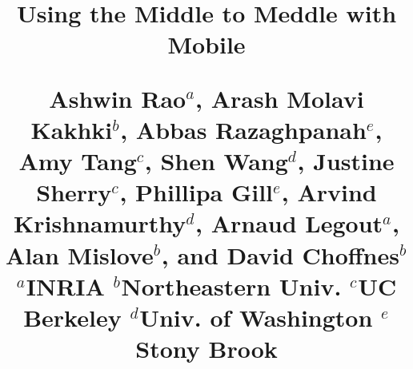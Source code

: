 \documentclass[letterpaper,twocolumn,10pt]{sig-alternate-10pt}
\begin{document}
\date{}

\title{{\Large \bf Using the Middle to Meddle with Mobile} 
\\
\vspace{1em}
\author{} 
\large Ashwin Rao${^a}$, Arash Molavi Kakhki${^b}$, Abbas Razaghpanah${^e}$, Amy Tang${^c}$, Shen Wang${^d}$, Justine Sherry${^c}$, %
Phillipa Gill${^e}$, \large Arvind Krishnamurthy${^d}$, Arnaud Legout${^a}$, Alan Mislove${^b}$, and David Choffnes${^b}$\\ 
\vspace{1em}
\large $^{a}$INRIA $^{b}$Northeastern Univ. $^{c}$UC Berkeley $^{d}$Univ. of Washington  ${^e}$Stony Brook
\vspace{-3em}
} 

\maketitle
\vspace{-2em}




%



%







%






{\scriptsize 
}

\end{document}
